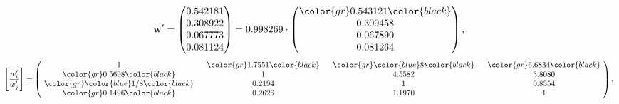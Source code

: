 \begin{example}
\begin{equation*}
\mathbf{w}^{\prime} =
\begin{pmatrix}
0.542181\\
0.308922\\
0.067773\\
0.081124
\end{pmatrix} =
0.998269\cdot
\begin{pmatrix}
\color{gr} 0.543121\color{black} \\
0.309458\\
0.067890\\
0.081264
\end{pmatrix},
\end{equation*}
\begin{equation*}
\left[ \frac{{w}^{\prime}_i}{{w}^{\prime}_j} \right] =
\begin{pmatrix}
$\,\,$ 1 $\,\,$ & $\,\,$\color{gr} 1.7551\color{black} $\,\,$ & $\,\,$\color{gr} \color{blue} 8\color{black} $\,\,$ & $\,\,$\color{gr} 6.6834\color{black} $\,\,$ \\
$\,\,$\color{gr} 0.5698\color{black} $\,\,$ & $\,\,$ 1 $\,\,$ & $\,\,$4.5582$\,\,$ & $\,\,$3.8080  $\,\,$ \\
$\,\,$\color{gr} \color{blue}  1/8\color{black} $\,\,$ & $\,\,$0.2194$\,\,$ & $\,\,$ 1 $\,\,$ & $\,\,$0.8354 $\,\,$ \\
$\,\,$\color{gr} 0.1496\color{black} $\,\,$ & $\,\,$0.2626$\,\,$ & $\,\,$1.1970$\,\,$ & $\,\,$ 1  $\,\,$ \\
\end{pmatrix},
\end{equation*}
\end{example}
\newpage
